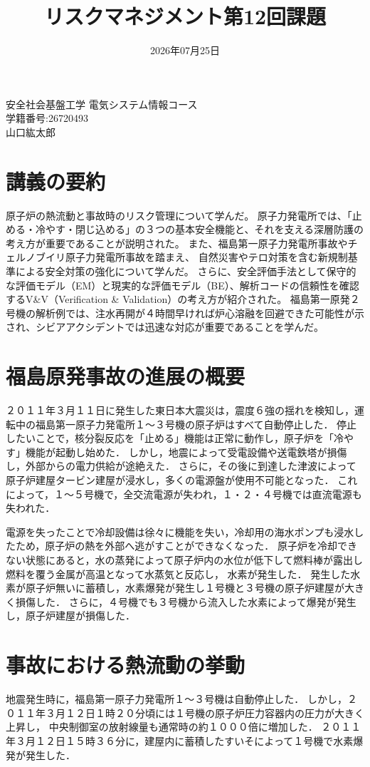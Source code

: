 \documentclass{ltjsarticle}  %
\date{2026年07月25日}        %
\title{リスクマネジメント第12回課題}  %
\makeatletter
\newcommand{\authorname}{安全社会基盤工学 電気システム情報コース\\学籍番号:26720493\\山口紘太郎}  %
\renewcommand{\maketitle}{%
  \begin{flushright}
    \@date
  \end{flushright}
  \vspace{1cm}
  \begin{center}
    {\Large \@title}
  \end{center}
  \begin{flushright}
    {\large \authorname}
  \end{flushright}
  \vspace{1.5cm}
}
\makeatother
\begin{document}
\maketitle

\section{講義の要約}
原子炉の熱流動と事故時のリスク管理について学んだ。
原子力発電所では、「止める・冷やす・閉じ込める」の３つの基本安全機能と、それを支える深層防護の考え方が重要であることが説明された。
また、福島第一原子力発電所事故やチェルノブイリ原子力発電所事故を踏まえ、
自然災害やテロ対策を含む新規制基準による安全対策の強化について学んだ。
さらに、安全評価手法として保守的な評価モデル（EM）と現実的な評価モデル（BE）、解析コードの信頼性を確認するV\&V（Verification \& Validation）の考え方が紹介された。
福島第一原発２号機の解析例では、注水再開が４時間早ければ炉心溶融を回避できた可能性が示され、シビアアクシデントでは迅速な対応が重要であることを学んだ。

\section{福島原発事故の進展の概要}
２０１１年３月１１日に発生した東日本大震災は，震度６強の揺れを検知し，運転中の福島第一原子力発電所１〜３号機の原子炉はすべて自動停止した．
停止したいことで，核分裂反応を「止める」機能は正常に動作し，原子炉を「冷やす」機能が起動し始めた．
しかし，地震によって受電設備や送電鉄塔が損傷し，外部からの電力供給が途絶えた．
さらに，その後に到達した津波によって原子炉建屋タービン建屋が浸水し，多くの電源盤が使用不可能となった．
これによって，１〜５号機で，全交流電源が失われ，１・２・４号機では直流電源も失われた．

電源を失ったことで冷却設備は徐々に機能を失い，冷却用の海水ポンプも浸水したため，原子炉の熱を外部へ逃がすことができなくなった．
原子炉を冷却できない状態にあると，水の蒸発によって原子炉内の水位が低下して燃料棒が露出し燃料を覆う金属が高温となって水蒸気と反応し，
水素が発生した．
発生した水素が原子炉無いに蓄積し，水素爆発が発生し１号機と３号機の原子炉建屋が大きく損傷した．
さらに，４号機でも３号機から流入した水素によって爆発が発生し，原子炉建屋が損傷した．\cite{jaero}

\section{事故における熱流動の挙動}
地震発生時に，福島第一原子力発電所１〜３号機は自動停止した．
しかし，２０１１年３月１２日１時２０分頃には１号機の原子炉圧力容器内の圧力が大きく上昇し，
中央制御室の放射線量も通常時の約１０００倍に増加した．
２０１１年３月１２日１５時３６分に，建屋内に蓄積したすいそによって１号機で水素爆発が発生した．
\end{document}
